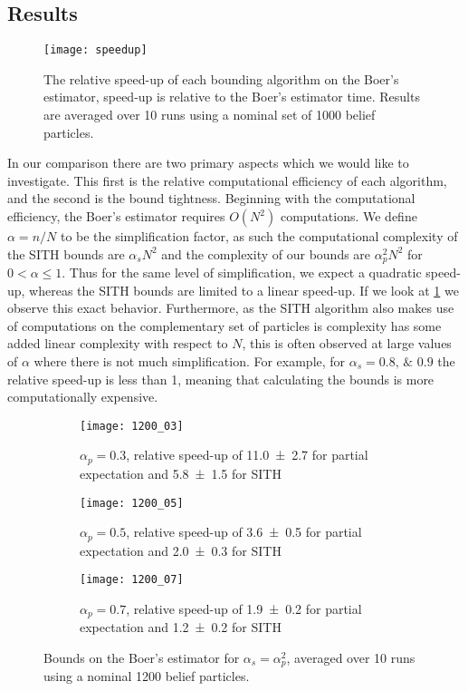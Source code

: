 \subsection{Results}
\begin{figure}[h]
	\centering
	\texttt{[image: speedup]}
	\caption{The relative speed-up of each bounding algorithm on the Boer's estimator, speed-up is relative to the Boer's estimator time. Results are averaged over 10 runs using a nominal set of 1000 belief particles.}
	\label{fig:speedup}
\end{figure}
	In our comparison there are two primary aspects which we would like to investigate. This first is the relative computational efficiency of each algorithm, and the second is the bound tightness. Beginning with the computational efficiency, the Boer's estimator requires $O(N^2)$ computations. We define $\alpha = n/N$ to be the simplification factor, as such the computational complexity of the SITH bounds are $\alpha_sN^2$ and the complexity of our bounds are $\alpha_p^2N^2$ for $0<\alpha\leq1$. Thus for the same level of simplification, we expect a quadratic speed-up, whereas the SITH bounds are limited to a linear speed-up. If we look at \cref{fig:speedup} we observe this exact behavior. Furthermore, as the SITH algorithm also makes use of computations on the complementary set of particles is complexity has some added linear complexity with respect to $N$, this is often observed at large values of $\alpha$ where there is not much simplification. For example, for $\alpha_s=\numlist{0.8;0.9}$ the relative speed-up is less than 1, meaning that calculating the bounds is more computationally expensive.
\begin{figure} [h]
	\centering
	\begin{subfigure}[t]{0.32\textwidth}
		\centering
		\texttt{[image: 1200\_03]}
		\caption{$\alpha_p=0.3$, relative speed-up of \num{11.0\pm2.7} for partial expectation and \num{5.8\pm1.5} for SITH}
		\label{fig:alpha_03}
	\end{subfigure}
	\hfill
	\begin{subfigure}[t]{0.32\textwidth}
		\centering
		\texttt{[image: 1200\_05]}
		\caption{$\alpha_p=0.5$, relative speed-up of \num{3.6\pm0.5} for partial expectation and \num{2.0\pm0.3} for SITH}
		\label{fig:alpha_05}
	\end{subfigure}
	\hfill
	\begin{subfigure}[t]{0.32\textwidth}
		\centering
		\texttt{[image: 1200\_07]}
		\caption{$\alpha_p=0.7$, relative speed-up of \num{1.9\pm0.2} for partial expectation and \num{1.2\pm0.2} for SITH}
		\label{fig:alpha_07}
	\end{subfigure}
	\caption{Bounds on the Boer's estimator for $\alpha_s=\alpha_p^2$, averaged over 10 runs using a nominal 1200 belief particles.}
	\label{fig:boers_bound_comp}
\end{figure}
